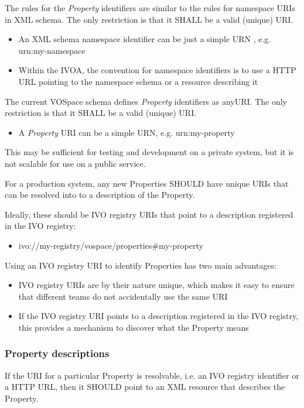\documentclass[11pt,a4paper]{ivoa}
\begin{document}
The rules for the \emph{Property} identifiers are similar to the rules for namespace URIs in XML schema. The only restriction is that it SHALL be a valid (unique) URI.

\begin{itemize}
    \item An XML schema namespace identifier can be just a simple URN \citep{std:RFC2141}, e.g. urn:my-namespace
    \item Within the IVOA, the convention for namespace identifiers is to use a HTTP URL pointing to the namespace schema or a resource describing it
\end{itemize}

The current VOSpace schema defines \emph{Property} identifiers as anyURI. The only restriction is that it SHALL be a valid (unique) URI.

\begin{itemize}
    \item A \emph{Property} URI can be a simple URN, e.g. urn:my-property
\end{itemize}

This may be sufficient for testing and development on a private system, but it is not scalable for use on a public service.

For a production system, any new Properties SHOULD have unique URIs that can be resolved into to a description of the Property.

Ideally, these should be IVO registry URIs that point to a description registered in the IVO registry:

\begin{itemize}
    \item ivo://my-registry/vospace/properties\#my-property
\end{itemize}

Using an IVO registry URI to identify Properties has two main advantages:

\begin{itemize}
    \item IVO registry URIs are by their nature unique, which makes it easy to ensure that different teams do not accidentally use the same URI
    \item If the IVO registry URI points to a description registered in the IVO registry, this provides a mechanism to discover what the Property means
\end{itemize}

\subsubsection{Property descriptions}
\label{subsubsec:property descriptions}
If the URI for a particular Property is resolvable, i.e. an IVO registry identifier or a HTTP URL, then it SHOULD point to an XML resource that describes the Property.
\end{document}
